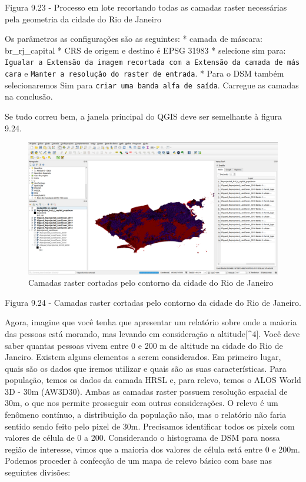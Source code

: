 \documentclass[
  portuguese,
]{krantz}
\begin{document}
Figura 9.23 - Processo em lote recortando todas as camadas raster necessárias pela geometria da cidade do Rio de Janeiro

Os parâmetros as configurações são as seguintes:
* camada de máscara: br\_rj\_capital
* CRS de origem e destino é EPSG 31983
* selecione sim para: \texttt{Igualar\ a\ Extensão\ da\ imagem\ recortada\ com\ a\ Extensão\ da\ camada\ de\ máscara} e \texttt{Manter\ a\ resolução\ do\ raster\ de\ entrada}.
* Para o DSM também selecionaremos Sim para \texttt{criar\ uma\ banda\ alfa\ de\ saída}. Carregue as camadas na conclusão.

Se tudo correu bem, a janela principal do QGIS deve ser semelhante à figura 9.24.

\begin{figure}
\centering
\includegraphics{media/modulo9/fig924.png}
\caption{Camadas raster cortadas pelo contorno da cidade do Rio de Janeiro}
\end{figure}

Figura 9.24 - Camadas raster cortadas pelo contorno da cidade do Rio de Janeiro.

Agora, imagine que você tenha que apresentar um relatório sobre onde a maioria das pessoas está morando, mas levando em consideração a altitude{[}\^{}4{]}. Você deve saber quantas pessoas vivem entre 0 e 200 m de altitude na cidade do Rio de Janeiro. Existem alguns elementos a serem considerados. Em primeiro lugar, quais são os dados que iremos utilizar e quais são as suas características. Para população, temos os dados da camada HRSL e, para relevo, temos o ALOS World 3D - 30m (AW3D30). Ambas as camadas raster possuem resolução espacial de 30m, o que nos permite prosseguir com outras considerações. O relevo é um fenômeno contínuo, a distribuição da população não, mas o relatório não faria sentido sendo feito pelo pixel de 30m. Precisamos identificar todos os pixels com valores de célula de 0 a 200. Considerando o histograma de DSM para nossa região de interesse, vimos que a maioria dos valores de célula está entre 0 e 200m. Podemos proceder à confecção de um mapa de relevo básico com base nas seguintes divisões:
\end{document}
